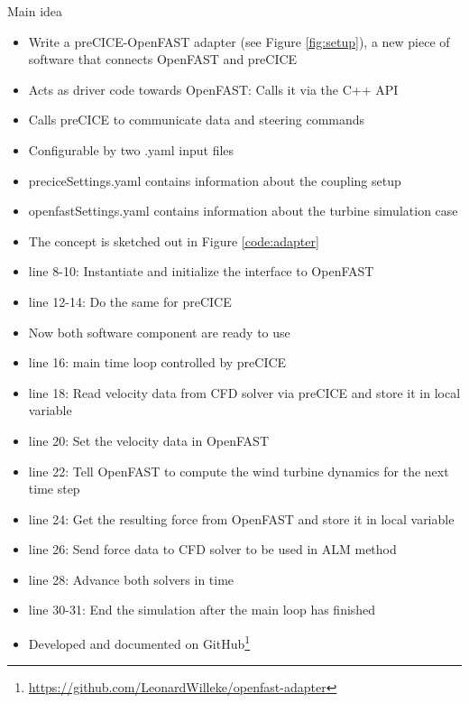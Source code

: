 Main idea
\begin{itemize}
	\item Write a preCICE-OpenFAST adapter (see Figure \ref{fig:setup}), a new piece of software that connects OpenFAST and preCICE
	\item Acts as driver code towards OpenFAST: Calls it via the C++ API
	\item Calls preCICE to communicate data and steering commands
	\item Configurable by two .yaml input files
	\item preciceSettings.yaml contains information about the coupling setup
	\item openfastSettings.yaml contains information about the turbine simulation case
	\item The concept is sketched out in Figure \ref{code:adapter}
	\item line 8-10: Instantiate and initialize the interface to OpenFAST
	\item line 12-14: Do the same for preCICE
	\item Now both software component are ready to use
	\item line 16: main time loop controlled by preCICE
	\item line 18: Read velocity data from CFD solver via preCICE and store it in local variable
	\item line 20: Set the velocity data in OpenFAST
	\item line 22: Tell OpenFAST to compute the wind turbine dynamics for the next time step
	\item line 24: Get the resulting force from OpenFAST and store it in local variable
	\item line 26: Send force data to CFD solver to be used in ALM method
	\item line 28: Advance both solvers in time
	\item line 30-31: End the simulation after the main loop has finished
	\item Developed and documented on GitHub\footnote{\url{https://github.com/LeonardWilleke/openfast-adapter}}\\
\end{itemize}

